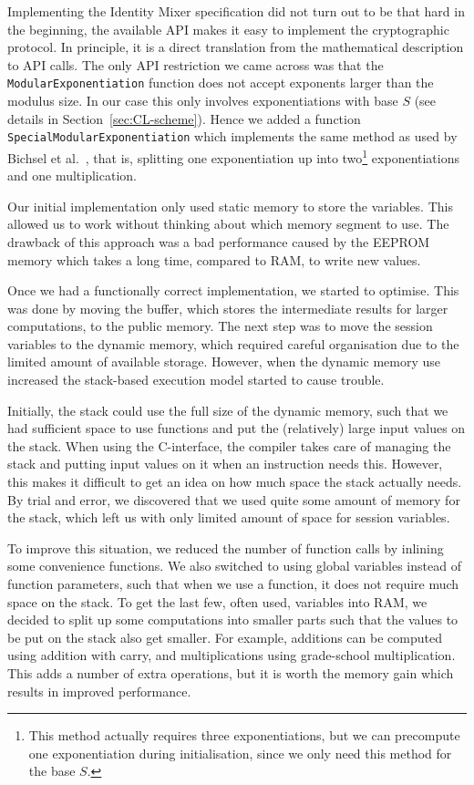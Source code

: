 Implementing the Identity Mixer specification did not turn out to be that hard
in the beginning, the available API makes it easy to implement the cryptographic
protocol. In principle, it is a direct translation from the mathematical
description to API calls. The only API restriction we came across was that the
\texttt{ModularExponentiation} function does not accept exponents larger than
the modulus size. In our case this only involves exponentiations with base $S$
(see details in Section~\ref{sec:CL-scheme}). Hence we added a function
\texttt{SpecialModularExponentiation} which implements the same method as used
by Bichsel et al.~\cite{BichselCGS2009}, that is, splitting one exponentiation
up into two\footnote{This method actually requires three exponentiations, but
we can precompute one exponentiation during initialisation, since we only need
this method for the base $S$.} exponentiations and one multiplication.

Our initial implementation only used static memory to store the variables. This
allowed us to work without thinking about which memory segment to use. The
drawback of this approach was a bad performance caused by the EEPROM memory
which takes a long time, compared to RAM, to write new values.

Once we had a functionally correct implementation, we started to optimise. This
was done by moving the buffer, which stores the intermediate results for larger
computations, to the public memory. The next step was to move the session
variables to the dynamic memory, which required careful organisation due to the
limited amount of available storage. However, when the dynamic memory use
increased the stack-based execution model started to cause trouble.

Initially, the stack could use the full size of the dynamic memory, such that
we had sufficient space to use functions and put the (relatively) large input
values on the stack. When using the C-interface, the compiler takes care of
managing the stack and putting input values on it when an instruction needs
this. However, this makes it difficult to get an idea on how much space the
stack actually needs. By trial and error, we discovered that we used quite some
amount of memory for the stack, which left us with only limited amount of space
for session variables.

To improve this situation, we reduced the number of function calls by inlining
some convenience functions. We also switched to using global variables instead
of function parameters, such that when we use a function, it does not require
much space on the stack. To get the last few, often used, variables into RAM,
we decided to split up some computations into smaller parts such that the
values to be put on the stack also get smaller. For example, additions can be
computed using addition with carry, and multiplications using grade-school
multiplication. This adds a number of extra operations, but it is worth the
memory gain which results in improved performance.

